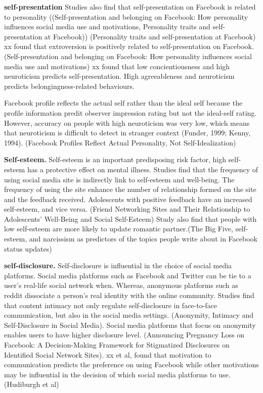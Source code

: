  \textbf{self-presentation} Studies also find that self-presentation on Facebook is related to personality ((Self-presentation and belonging on Facebook: How personality influences social media use and motivations, Personality traits and self-presentation at Facebook)) (Personality traits and self-presentation at Facebook) xx found that extroversion is positively related to self-presentation on Facebook.  (Self-presentation and belonging on Facebook: How personality influences social media use and motivations) xx found that low concientiousness and high neuroticism predicts self-presentation. High agreeableness and neuroticism predicts belongingness-related behaviours.

Facebook profile reflects the actual self rather than the ideal self because the profile information predit observer impression rating but not the ideal-self rating. However, accuracy on people with high neuroticism was very low, which means that neuroticism is difficult to detect in stranger context (Funder, 1999; Kenny, 1994). (Facebook Profiles Reflect Actual Personality, Not Self-Idealization)


\textbf{Self-esteem.}
Self-esteem is an important predisposing risk factor, high self-esteem has a protective effect on mental illness. Studies find that the frequency of using social media site is indirectly link to self-esteem and well-being. The frequency of using the site enhance the number of relationship formed on the site and the feedback received. Adolescents with positive feedback have an increased self-esteem, and vice versa. (Friend Networking Sites and Their Relationship to Adolescents’ Well-Being and Social Self-Esteem) Study also find that people with low self-esteem are more likely to update romantic partner.(The Big Five, self-esteem, and narcissism as predictors of the topics people write about in Facebook status updates)


\textbf{self-disclosure.}
Self-disclosure is influential in the choice of social media platforms. Social media platforms such as Facebook and Twitter can be tie to a user's real-life social network when. Whereas, anonymous platforms such as reddit dissociate a person's real identity with the online community. Studies find that content intimacy not only regulate self-disclosure in face-to-face communication, but also in the social media settings.  (Anonymity, Intimacy and Self-Disclosure in Social Media). Social media platforms that focus on anonymity enables users to have higher disclosure level. (Announcing Pregnancy Loss on Facebook: A Decision-Making Framework for Stigmatized Disclosures on Identified Social Network Sites). xx et al, found that motivation to communication predicts the preference on using Facebook while other motivations may be influential in the decision of which social media platforms to use. (Hudiburgh et al) 


